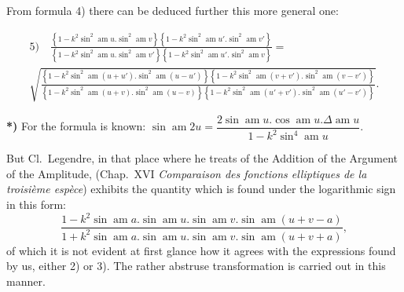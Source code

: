 \documentclass{article}
\begin{document}
From formula 4) there can be deduced further this more general one:

\[
\begin{gathered}
\text{5)}\quad \frac{\left\{1-k^{2}\sin^{2}\operatorname{am}u.\sin^{2}\operatorname{am}v\right\}\left\{1-k^{2}\sin^{2}\operatorname{am}u'.\sin^{2}\operatorname{am}v'\right\}}{\left\{1-k^{2}\sin^{2}\operatorname{am}u.\sin^{2}\operatorname{am}v'\right\}\left\{1-k^{2}\sin^{2}\operatorname{am}u'.\sin^{2}\operatorname{am}v\right\}}=\\[1.5ex]
\sqrt{\frac{\left\{1-k^{2}\sin^{2}\operatorname{am}(u+u').\sin^{2}\operatorname{am}(u-u')\right\}\left\{1-k^{2}\sin^{2}\operatorname{am}(v+v').\sin^{2}\operatorname{am}(v-v')\right\}}{\left\{1-k^{2}\sin^{2}\operatorname{am}(u+v).\sin^{2}\operatorname{am}(u-v)\right\}\left\{1-k^{2}\sin^{2}\operatorname{am}(u'+v').\sin^{2}\operatorname{am}(u'-v')\right\}}}.
\end{gathered}
\]

\textbf{*)} For the formula is known: $\sin\operatorname{am}2u=\dfrac{2\sin\operatorname{am}u.\cos\operatorname{am}u.\Delta\operatorname{am}u}{1-k^{2}\sin^{4}\operatorname{am}u}$.

But Cl.\ Legendre, in that place where he treats of the Addition of the Argument of the Amplitude, (Chap.\ XVI \emph{Comparaison des fonctions elliptiques de la troisième espèce}) exhibits the quantity which is found under the logarithmic sign in this form:
\[
\frac{1-k^{2}\sin\operatorname{am}a.\sin\operatorname{am}u.\sin\operatorname{am}v.\sin\operatorname{am}(u+v-a)}{1+k^{2}\sin\operatorname{am}a.\sin\operatorname{am}u.\sin\operatorname{am}v.\sin\operatorname{am}(u+v+a)},
\]
of which it is not evident at first glance how it agrees with the expressions found by us, either 2) or 3). The rather abstruse transformation is carried out in this manner.
\end{document}
